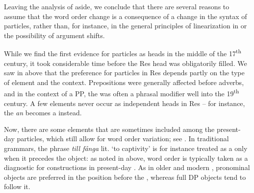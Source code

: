\documentclass[output=paper]{langscibook}
\begin{document}
\ea\label{ex:lalu:61}

\z
\ex\label{ex:lalu:62}
\z
\z


Leaving the analysis of   aside, we conclude that there are several reasons to assume that the word order change is a consequence of a change in the syntax of particles, rather than, for instance, in the general principles of linearization in  or the possibility of argument shifts. 



While we find the first evidence for particles as heads in the middle of the 17\textsuperscript{th} century, it took considerable time before the Res head was obligatorily filled. We saw in  above that the preference for particles in Res depends partly on the type of element and the context. Prepositions were generally affected before adverbs, and in the context of a PP, the  was often a phrasal modifier well into the 19\textsuperscript{th} century. A few elements never occur as independent  heads in Res – for instance, the  \textit{an} becomes a  instead.



Now, there are some elements that are sometimes included among the present-day particles, which still allow for word order variation; see . In traditional grammars, the phrase \textit{till fånga} lit. ‘to captivity’ is for instance treated as a  only when it precedes the object: as noted in  above, word order is typically taken as a diagnostic for  constructions in present-day . As in older  and modern , pronominal objects are preferred in the position before the , whereas full DP objects tend to follow it.
\end{document}
